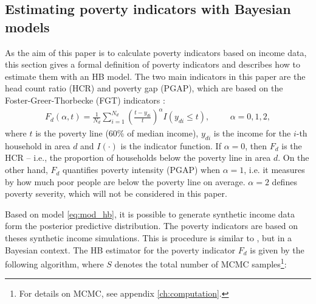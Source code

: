 \subsection{Estimating poverty indicators with Bayesian models}
\label{ch:indicators}

As the aim of this paper is to calculate poverty indicators based on income data,
this section gives a formal definition of poverty indicators and describes how to estimate them with an HB model.
The two main indicators in this paper are the head count ratio (HCR) and poverty gap (PGAP), which
are based on the Foster-Greer-Thorbecke (FGT) indicators \citep{foster_class_1984}:
\begin{gather*}
    F_d(\alpha, t) = \displaystyle \frac 1 {N_d} \sum_{i=1}^{N_d}\left( \frac{t - y_{di}}{t} \right)^\alpha I (y_{di} \le t),
    \hspace{1cm}\alpha = 0, 1, 2,
\end{gather*}
where $t$ is the poverty line (60\% of median income), $y_{di}$ is the income for the $i$-th household in area $d$ and $I(\cdot)$ is the indicator function.
If $\alpha = 0$, then $F_d$ is the HCR – i.e., the proportion of households below the poverty line in area $d$.
On the other hand, $F_d$ quantifies poverty intensity (PGAP) when $\alpha = 1$, i.e. it measures by how much poor people are below the poverty line on average.
$\alpha = 2$ defines poverty severity, which will not be considered in this paper.

Based on model \ref{eq:mod_hb}, it is possible to generate synthetic income data form the posterior predictive distribution.
The poverty indicators are based on theses synthetic income simulations.
This is procedure is similar to \cite{rojas_perilla_data_2020}, but in a Bayesian context.
The HB estimator for the poverty indicator $F_d$ is given by the following algorithm, where $S$ denotes the total number of MCMC samples\footnote{For details on MCMC, see appendix \ref{ch:computation}.}:

\newpage


